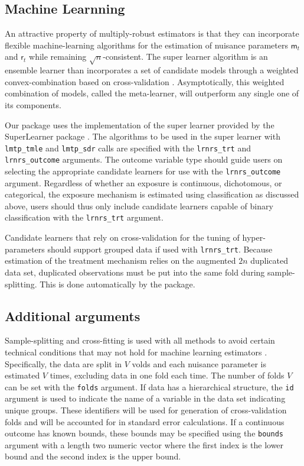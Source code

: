 \documentclass[twoside,11pt]{article}
\newcommand{\Q}{\mathsf{m}}
\renewcommand{\r}{\mathsf{r}}
\newcommand{\pkg}[1]{{\fontseries{b}\selectfont #1}}
\let\code=\texttt
\begin{document}
\hypertarget{machine-learning}{\subsection{Machine Learnning}\label{machine-learning}}

An attractive property of multiply-robust estimators is that they can incorporate flexible machine-learning algorithms for the estimation of nuisance parameters $\Q_t$ and $\r_t$ while remaining $\sqrt{n}$-consistent. The super learner algorithm is an ensemble learner than incorporates a set of candidate models through a weighted convex-combination based on cross-validation \citep{laanSuperLearner2007}. Asymptotically, this weighted combination of models, called the meta-learner, will outperform any single one of its components.

Our package uses the implementation of the super learner provided by the \pkg{SuperLearner} package \citep{SuperLearnerPkg}. The algorithms to be used in the super learner with \code{lmtp\_tmle} and \code{lmtp\_sdr} calls are specified with the \code{lrnrs\_trt} and \code{lrnrs\_outcome} arguments. The outcome variable type should guide users on selecting the appropriate candidate learners for use with the \code{lrnrs\_outcome} argument. Regardless of whether an exposure is continuous, dichotomous, or categorical, the exposure mechanism is estimated using classification as discussed above, users should thus only include candidate learners capable of binary classification with the \code{lrnrs\_trt} argument.

Candidate learners that rely on cross-validation for the tuning of hyper-parameters should support grouped data if used with \code{lrnrs\_trt}. Because estimation of the treatment mechanism relies on the augmented $2n$ duplicated data set, duplicated observations must be put into the same fold during sample-splitting. This is done automatically by the package.

\hypertarget{additional-arguments}{\subsection{Additional arguments}\label{additional-arguments}}

Sample-splitting and cross-fitting is used with all methods to avoid certain technical conditions that may not hold for machine learning estimators \citep{zhengCrossValidatedTargetedMinimumLossBased2011b,chernozhukovDoubleDebiasedMachine2018}. Specifically, the data are split in $V$ volds and each nuisance parameter is estimated $V$ times, excluding data in one fold each time. The number of folds $V$ can be set with the \code{folds} argument.  If data has a hierarchical structure, the \code{id} argument is used to indicate the name of a variable in the data set indicating unique groups. These identifiers will be used for generation of cross-validation folds and will be accounted for in standard error calculations. If a continuous outcome has known bounds, these bounds may be specified using the \code{bounds} argument with a length two numeric vector where the first index is the lower bound and the second index is the upper bound.
\end{document}
